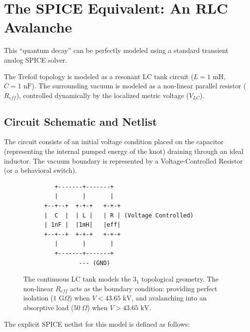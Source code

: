 \section{The SPICE Equivalent: An RLC Avalanche}
This ``quantum decay'' can be perfectly modeled using a standard transient analog SPICE solver. 

The Trefoil topology is modeled as a resonant LC tank circuit ($L = 1 \text{ mH}$, $C = 1 \text{ nF}$). The surrounding vacuum is modeled as a non-linear parallel resistor ($R_{eff}$), controlled dynamically by the localized metric voltage ($V_{LC}$). 

\subsection{Circuit Schematic and Netlist}
The circuit consists of an initial voltage condition placed on the capacitor (representing the internal pumped energy of the knot) draining through an ideal inductor. The vacuum boundary is represented by a Voltage-Controlled Resistor (or a behavioral switch). 

\begin{figure}[h!]
    \centering
    \begin{tcolorbox}[colback=black!5!white, colframe=black!75!white, title=Simplified LTspice Equivalent Circuit]
    \centering
    \begin{verbatim}
         +-------+-------+
         |       |       |
      +--+--+  +-+-+   +-+-+
      |  C  |  | L |   | R | (Voltage Controlled)
      | 1nF |  |1mH|   |eff|
      +--+--+  +-+-+   +-+-+
         |       |       |
         +-------+-------+
                --- (GND)
    \end{verbatim}
    \end{tcolorbox}
    \caption{The continuous LC tank models the $3_1$ topological geometry. The non-linear $R_{eff}$ acts as the boundary condition: providing perfect isolation ($1\text{ G}\Omega$) when $V < 43.65\text{ kV}$, and avalanching into an absorptive load ($50\ \Omega$) when $V > 43.65\text{ kV}$.}
\end{figure}

The explicit SPICE netlist for this model is defined as follows:

